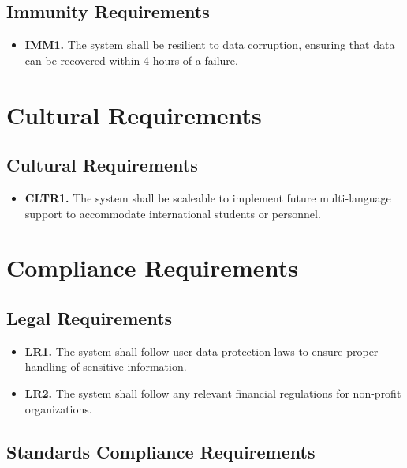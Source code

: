 \documentclass[12pt]{article}
\begin{document}
\subsection{Immunity Requirements}

\label{IMM}

\begin{itemize}
    \item \textbf{IMM1.} The system shall be resilient to data corruption, ensuring that data can be recovered within 4 hours of a failure.
\end{itemize}

\section{Cultural Requirements}
\subsection{Cultural Requirements}

\label{CLTR}

\begin{itemize}
    \item \textbf{CLTR1.} The system shall be scaleable to implement future multi-language support to accommodate international students or personnel.
\end{itemize}

\section{Compliance Requirements}
\subsection{Legal Requirements}

\label{LR}

\begin{itemize}
    \item \textbf{LR1.} The system shall follow user data protection laws to ensure proper handling of sensitive information.
    \item \textbf{LR2.} The system shall follow any relevant financial regulations for non-profit organizations.
\end{itemize}
\subsection{Standards Compliance Requirements}
\end{document}
